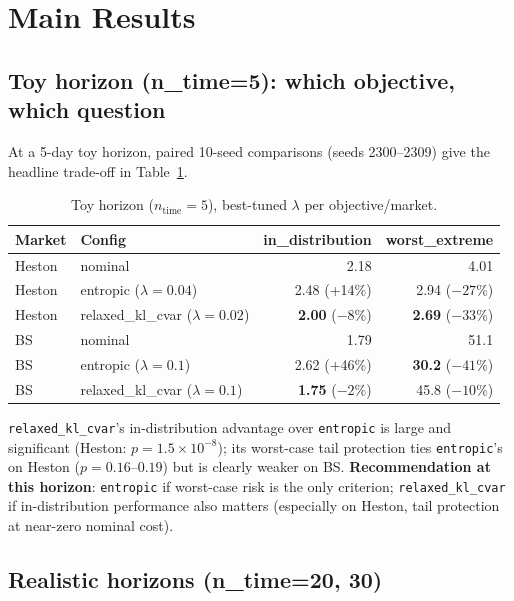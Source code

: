 \documentclass[11pt]{article}
\begin{document}
\section{Main Results}

\subsection{Toy horizon (n\_time=5): which objective, which question}
\label{sec:toy}

At a 5-day toy horizon, paired 10-seed comparisons (seeds 2300--2309) give the headline
trade-off in Table~\ref{tab:toy}.

\begin{table}[h]
  \centering
  \caption{Toy horizon ($n_{\mathrm{time}}=5$), best-tuned $\lambda$ per objective/market.}
  \label{tab:toy}
  \begin{tabular}{llrr}
    \toprule
    Market & Config & in\_distribution & worst\_extreme \\
    \midrule
    Heston & nominal & 2.18 & 4.01 \\
    Heston & entropic ($\lambda=0.04$) & 2.48 (+14\%) & 2.94 ($-27\%$) \\
    Heston & relaxed\_kl\_cvar ($\lambda=0.02$) & \textbf{2.00} ($-8\%$) & \textbf{2.69} ($-33\%$) \\
    BS & nominal & 1.79 & 51.1 \\
    BS & entropic ($\lambda=0.1$) & 2.62 (+46\%) & \textbf{30.2} ($-41\%$) \\
    BS & relaxed\_kl\_cvar ($\lambda=0.1$) & \textbf{1.75} ($-2\%$) & 45.8 ($-10\%$) \\
    \bottomrule
  \end{tabular}
\end{table}

\texttt{relaxed\_kl\_cvar}'s in-distribution advantage over \texttt{entropic} is large and
significant (Heston: $p=1.5\times10^{-8}$); its worst-case tail protection ties
\texttt{entropic}'s on Heston ($p=0.16$--$0.19$) but is clearly weaker on BS. \textbf{Recommendation
at this horizon}: \texttt{entropic} if worst-case risk is the only criterion; \texttt{relaxed\_kl\_cvar}
if in-distribution performance also matters (especially on Heston, tail protection at
near-zero nominal cost).

\subsection{Realistic horizons (n\_time=20, 30)}
\label{sec:longer}
\end{document}
